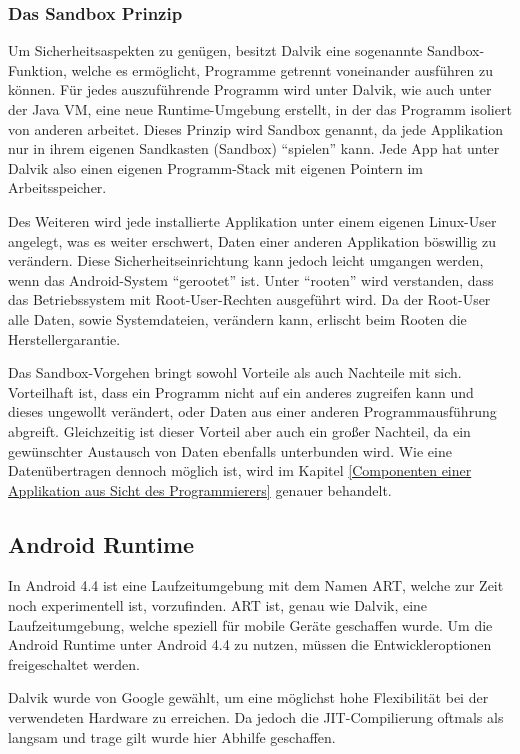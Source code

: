 \subsubsection{Das Sandbox Prinzip} \label{Das Sandbox Prinzip}
Um Sicherheitsaspekten zu gen\"ugen, besitzt Dalvik eine sogenannte Sandbox-Funktion, welche es erm\"oglicht, Programme getrennt voneinander ausf\"uhren zu k\"onnen. F\"ur jedes auszuf\"uhrende Programm wird unter Dalvik, wie auch unter der Java VM, eine neue Runtime-Umgebung erstellt, in der das Programm isoliert von anderen arbeitet. 
Dieses Prinzip wird Sandbox genannt, da jede Applikation nur in ihrem eigenen Sandkasten (Sandbox) "`spielen"' kann. Jede App hat unter Dalvik also einen eigenen Programm-Stack mit eigenen Pointern im Arbeitsspeicher.

Des Weiteren wird jede installierte Applikation unter einem eigenen Linux-User angelegt, was es weiter erschwert, Daten einer anderen Applikation b\"oswillig zu ver\"andern. Diese Sicherheitseinrichtung kann jedoch leicht umgangen werden, wenn das Android-System "`gerootet"' ist. Unter "`rooten"' wird verstanden, dass das Betriebssystem mit Root-User-Rechten ausgef\"uhrt wird. Da der Root-User alle Daten, sowie Systemdateien, ver\"andern kann, erlischt beim Rooten die Herstellergarantie. \cite{Android44}

Das Sandbox-Vorgehen bringt sowohl Vorteile als auch Nachteile mit sich. Vorteilhaft ist, dass ein Programm nicht auf ein anderes zugreifen kann und dieses ungewollt ver\"andert, oder Daten aus einer anderen Programmausf\"uhrung abgreift. Gleichzeitig ist dieser Vorteil aber auch ein gro\ss{}er Nachteil, da ein gew\"unschter Austausch von Daten ebenfalls unterbunden wird.
Wie eine Daten\"ubertragen dennoch m\"oglich ist, wird im Kapitel \ref{Componenten einer Applikation aus Sicht des Programmierers} genauer behandelt.

\subsection{Android Runtime}
In Android 4.4 ist eine Laufzeitumgebung mit dem Namen \ac{ART}, welche zur Zeit noch experimentell ist, vorzufinden. \ac{ART} ist, genau wie Dalvik, eine Laufzeitumgebung, welche speziell f\"ur mobile Ger\"ate geschaffen wurde. Um die Android Runtime unter Android 4.4 zu nutzen, m\"ussen die Entwickleroptionen freigeschaltet werden.

Dalvik wurde von Google gew\"ahlt, um eine m\"oglichst hohe Flexibilit\"at bei der verwendeten Hardware zu erreichen. Da jedoch die \ac{JIT}-Compilierung oftmals als langsam und trage gilt wurde hier Abhilfe geschaffen.

